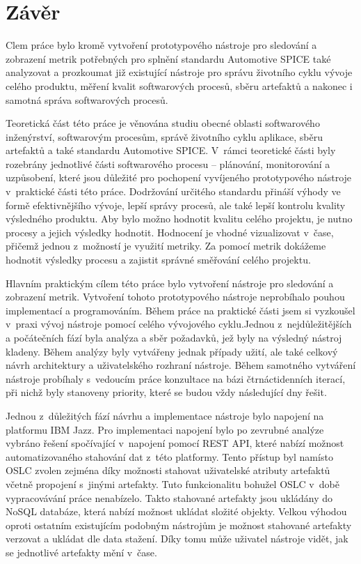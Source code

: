 \documentclass[czech,master]{diploma}
\begin{document}
\chapter{Závěr}
Clem práce bylo kromě vytvoření prototypového nástroje pro sledování a zobrazení metrik potřebných pro splnění standardu Automotive SPICE také analyzovat a prozkoumat již existující nástroje pro správu životního cyklu vývoje celého produktu, měření kvalit softwarových procesů, sběru artefaktů a nakonec i samotná správa softwarových procesů.

Teoretická část této práce je věnována studiu obecné oblasti softwarového inženýrství, softwarovým procesům, správě životního cyklu aplikace, sběru artefaktů a také standardu Automotive SPICE. V~rámci teoretické části byly rozebrány jednotlivé části softwarového procesu -- plánování, monitorování a uzpůsobení, které jsou důležité pro pochopení vyvíjeného prototypového nástroje v~praktické části této práce. Dodržování určitého standardu přináší výhody ve formě efektivnějšího vývoje, lepší správy procesů, ale také lepší kontrolu kvality výsledného produktu. Aby bylo možno hodnotit kvalitu celého projektu, je nutno procesy a jejich výsledky hodnotit. Hodnocení je vhodné vizualizovat v~čase, přičemž jednou z~možností je využití metriky. Za pomocí metrik dokážeme hodnotit výsledky procesu a zajistit správné směřování celého projektu.

Hlavním praktickým cílem této práce bylo vytvoření nástroje pro sledování a zobrazení metrik. Vytvoření tohoto prototypového nástroje neprobíhalo pouhou implementací a programováním.  Během práce na praktické části jsem si vyzkoušel v~praxi vývoj nástroje pomocí celého vývojového cyklu.Jednou z~nejdůležitějších a počátečních fází byla analýza a sběr požadavků, jež byly na výsledný nástroj kladeny. Během analýzy byly vytvářeny jednak případy užití, ale také celkový návrh architektury a uživatelského rozhraní nástroje. Během samotného vytváření nástroje probíhaly s~vedoucím práce konzultace na bázi čtrnáctidenních iterací, při nichž byly stanoveny priority, které se budou vždy následující dny řešit.

Jednou z~důležitých fází návrhu a implementace nástroje bylo napojení na platformu IBM Jazz. Pro implementaci napojení bylo po zevrubné analýze vybráno řešení spočívající v~napojení pomocí REST API, které nabízí možnost automatizovaného stahování dat z~této platformy. Tento přístup byl namísto OSLC zvolen zejména díky možnosti stahovat uživatelské atributy artefaktů včetně propojení s~jinými artefakty. Tuto funkcionalitu bohužel OSLC v~době vypracovávání práce nenabízelo. Takto stahované artefakty jsou ukládány do NoSQL databáze, která nabízí možnost ukládat složité objekty. Velkou výhodou oproti ostatním existujícím podobným nástrojům je možnost stahované artefakty verzovat a ukládat dle data stažení. Díky tomu může uživatel nástroje vidět, jak se jednotlivé artefakty mění v~čase.
\end{document}
